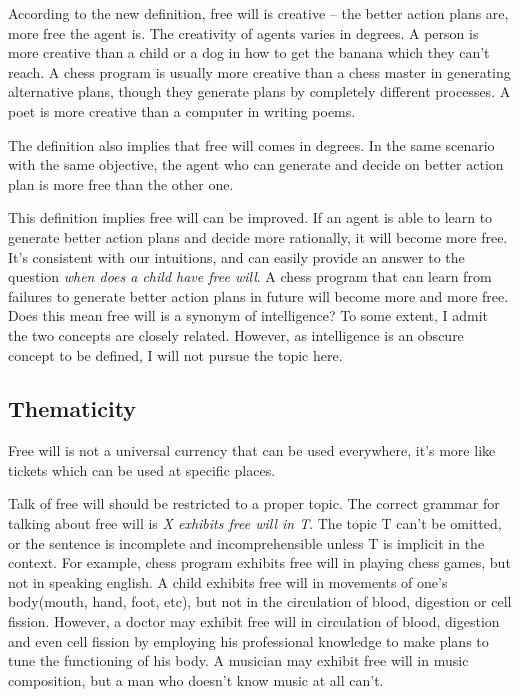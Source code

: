 According to the new definition, free will is creative -- the better action plans are, more free the agent is. The creativity of agents varies in degrees. A person is more creative than a child or a dog in how to get the banana which they can’t reach. A chess program is usually more creative than a chess master in generating alternative plans, though they generate plans by completely different processes. A poet is more creative than a computer in writing poems.

The definition also implies that free will comes in degrees. In the same scenario with the same objective, the agent who can generate and decide on better action plan is more free than the other one.

This definition implies free will can be improved. If an agent is able to learn to generate better action plans and decide more rationally, it will become more free. It’s consistent with our intuitions, and can easily provide an answer to the question \emph{when does a child have free will}. A chess program that can learn from failures to generate better action plans in future will become more and more free. Does this mean free will is a synonym of intelligence? To some extent, I admit the two concepts are closely related. However, as intelligence is an obscure concept to be defined, I will not pursue the topic here.

\subsection{Thematicity}

Free will is not a universal currency that can be used everywhere, it's more like tickets which can be used at specific places.

Talk of free will should be restricted to a proper topic. The correct grammar for talking about free will is \emph{X exhibits free will in T}. The topic T can’t be omitted, or the sentence is incomplete and incomprehensible unless T is implicit in the context. For example, chess program exhibits free will in playing chess games, but not in speaking english. A child exhibits free will in movements of one’s body(mouth, hand, foot, etc), but not in the circulation of blood, digestion or cell fission. However, a doctor may exhibit free will in circulation of blood, digestion and even cell fission by employing his professional knowledge to make plans to tune the functioning of his body. A musician may  exhibit free will in music composition, but a man who doesn’t know music at all can’t.

